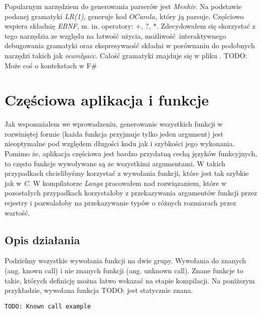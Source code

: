 \documentclass[declaration,shortabstract]{iithesis}
\begin{document}
Popularnym narzędziem do generowania parserów jest \textit{Menhir}. Na 
\newline podstawie podanej gramatyki \textit{LR(1)}, generuje kod $OCamla$, 
który ją parsuje. Częściowo wspiera składnię \textit{EBNF}, m. in. operatory: $
+$, $?$, $\ast$. Zdecydowałem się skorzystać z tego narzędzia ze względu na 
łatwość użycia, możliwość interaktywnego debugowania gramatyki oraz 
ekspresywność składni w porównaniu do podobnych narzędzi takich jak \textit
{ocamlyacc}. Całość gramatyki znajduje się w pliku 
. 
TODO: Może coś o kontekstach w F\#

\section{Częściowa aplikacja i funkcje}

Jak wspomniałem we wprowadzeniu, generowanie wszystkich funkcji w rozwiniętej 
formie (każda funkcja przyjmuje tylko jeden argument) jest nieoptymalne pod
względem długości kodu jak i szybkości jego wykonania. Pomimo że, aplikacja 
częściowa jest bardzo przydatną cechą języków funkcyjnych, to często funkcje
wywoływane są ze wszystkimi argumentami. W takich przypadkach chcielibyśmy 
korzystać z wywołania funkcji, które jest tak szybkie jak w \textit{C}. 
W kompilatorze \textit{Langa} pracowałem nad rozwiązaniem, które w pozostałych 
przypadkach korzystałoby z przekazywania argumentów funkcji przez rejestry i 
pozwalałoby na przekazywanie typów o różnych rozmiarach przez wartość. 

\subsection{Opis działania}

Podzielmy wszystkie wywołania funkcji na dwie grupy. Wywołania do znanych 
(ang. known call) i nie znanych funkcji (ang. unknown call). Znane funkcje to 
takie, których definicję można łatwo wskazać na etapie kompilacji. 
Na poniższym przykładzie, wywołana funkcja TODO: jest statycznie znana.

\begin{lstlisting}[frame=single, caption=Wywołanie statycznie znanej funkcji.]
TODO: Known call example
\end{lstlisting}
\end{document}
